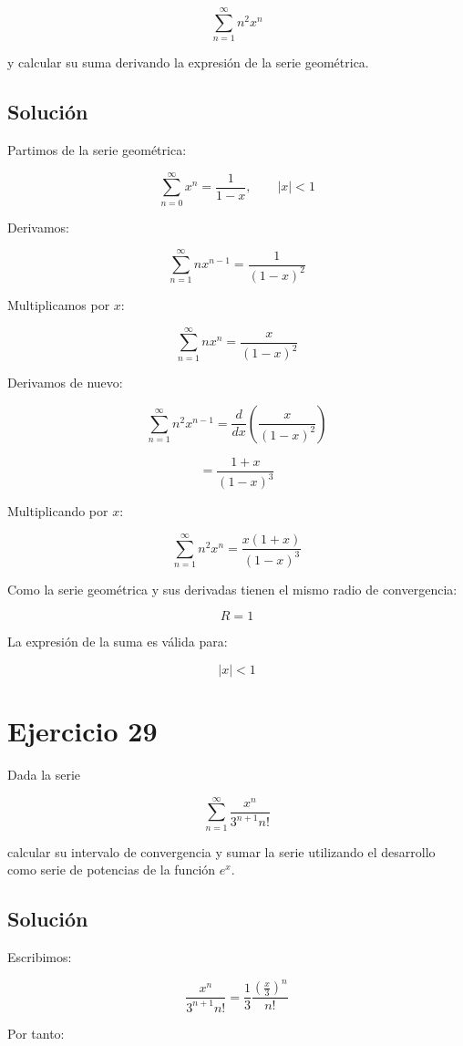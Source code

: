 \documentclass[fleqn]{article}
\begin{document}
	\[
	\sum_{n=1}^{\infty}n^2x^n
	\]

	y calcular su suma derivando la expresión de la serie geométrica.

	\subsection{Solución}

	Partimos de la serie geométrica:

	\[
	\sum_{n=0}^{\infty}x^n
	=
	\frac{1}{1-x},
	\qquad |x|<1
	\]

	Derivamos:

	\[
	\sum_{n=1}^{\infty}nx^{n-1}
	=
	\frac{1}{(1-x)^2}
	\]

	Multiplicamos por $x$:

	\[
	\sum_{n=1}^{\infty}nx^n
	=
	\frac{x}{(1-x)^2}
	\]

	Derivamos de nuevo:

	\[
	\sum_{n=1}^{\infty}n^2x^{n-1}
	=
	\frac{d}{dx}
	\left(
	\frac{x}{(1-x)^2}
	\right)
	\]

	\[
	=
	\frac{1+x}{(1-x)^3}
	\]

	Multiplicando por $x$:

	\[
	\boxed{
	\sum_{n=1}^{\infty}n^2x^n
	=
	\frac{x(1+x)}{(1-x)^3}
	}
	\]

	Como la serie geométrica y sus derivadas tienen el mismo radio de convergencia:

	\[
	\boxed{
	R=1
	}
	\]

	La expresión de la suma es válida para:

	\[
	\boxed{
	|x|<1
	}
	\]

\section{Ejercicio 29}
	Dada la serie

	\[
	\sum_{n=1}^{\infty}
	\frac{x^n}{3^{n+1}n!}
	\]

	calcular su intervalo de convergencia y sumar la serie utilizando el desarrollo como serie de potencias de la función $e^x$.

	\subsection{Solución}

	Escribimos:

	\[
	\frac{x^n}{3^{n+1}n!}
	=
	\frac{1}{3}
	\frac{\left(\frac{x}{3}\right)^n}{n!}
	\]

	Por tanto:
\end{document}

